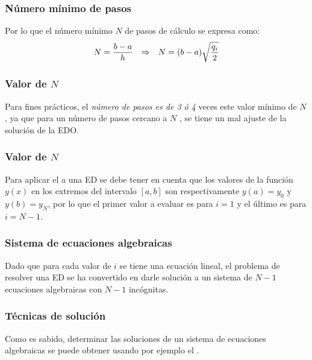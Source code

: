 \begin{frame}
\frametitle{Número mínimo de pasos}
Por lo que el número mínimo $N$ de pasos de cálculo se expresa como:
\begin{align}
N = \dfrac{b - a}{h} \hspace{0.25cm} \Rightarrow \hspace{0.25cm} N = (b - a) \sqrt{\dfrac{q_{i}}{2}}
\label{eq:ecuacion_16}
\end{align}
\end{frame}
\begin{frame}
\frametitle{Valor de $N$}
Para fines prácticos, el \emph{número de pasos es de 3 ó 4} veces este valor mínimo de $N$ , ya que para un número de pasos cercano a $N$ , se tiene un mal ajuste de la solución de la EDO.
\end{frame}
\begin{frame}
\frametitle{Valor de $N$}
Para aplicar el  a una ED se debe tener en cuenta que los
valores de la función $y(x)$ en los extremos del intervalo $[a,b]$ son respectivamente $y(a) = y_{0}$ y $y(b) = y_{N}$, por lo que el primer valor a evaluar es para $i = 1$ y el último es para $i = N - 1$.
\end{frame}
\begin{frame}
\frametitle{Sistema de ecuaciones algebraicas}
Dado que para cada valor de $i$ se tiene una ecuación lineal, el problema de resolver una ED se ha convertido en darle solución a un sistema de $N - 1$ ecuaciones algebraicas con $N - 1$ incógnitas.
\end{frame}
\begin{frame}
\frametitle{Técnicas de solución}
Como es sabido, determinar las soluciones de un sistema de ecuaciones algebraicas se puede obtener usando por ejemplo el .
\end{frame}
